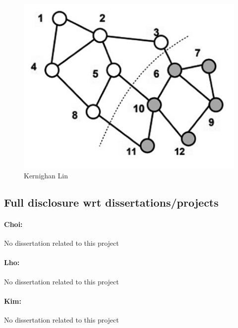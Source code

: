 \begin{figure}[htb!]
    \centering
    \includegraphics[width=0.5\linewidth]{FIG/kl.png}
    \caption{Kernighan Lin}
    \label{fig:kl}
\end{figure}

\subsection{Full disclosure wrt dissertations/projects}

\paragraph{Choi:} No dissertation related to this project

\paragraph{Lho:} No dissertation related to this project

\paragraph{Kim:} No dissertation related to this project
